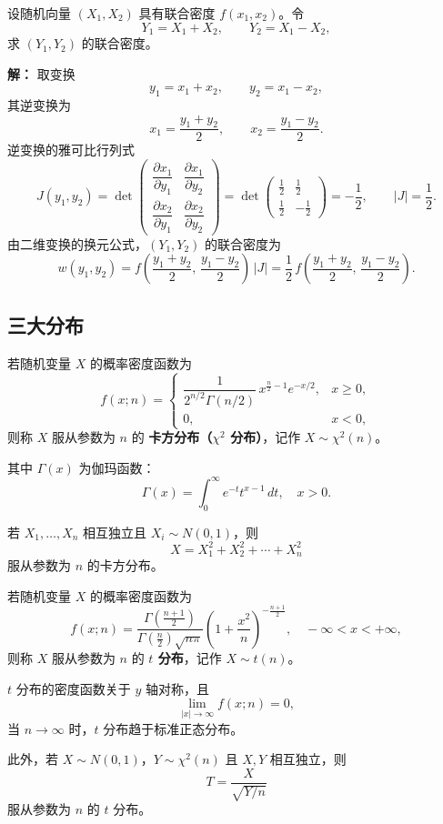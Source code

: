 \begin{example}
设随机向量 $(X_1,X_2)$ 具有联合密度 $f(x_1,x_2)$。令
\[
Y_1=X_1+X_2,\qquad Y_2=X_1-X_2,
\]
求 $(Y_1,Y_2)$ 的联合密度。

\textbf{解：} 取变换
\[
y_1=x_1+x_2,\qquad y_2=x_1-x_2,
\]
其逆变换为
\[
x_1=\frac{y_1+y_2}{2},\qquad x_2=\frac{y_1-y_2}{2}.
\]
逆变换的雅可比行列式
\[
J(y_1,y_2)=
\det\begin{pmatrix}
\dfrac{\partial x_1}{\partial y_1} & \dfrac{\partial x_1}{\partial y_2}\\[6pt]
\dfrac{\partial x_2}{\partial y_1} & \dfrac{\partial x_2}{\partial y_2}
\end{pmatrix}
=\det\begin{pmatrix}
\frac12 & \frac12\\[4pt]
\frac12 & -\frac12
\end{pmatrix}
=-\frac12,
\qquad |J|=\frac12.
\]
由二维变换的换元公式，$(Y_1,Y_2)$ 的联合密度为
\[
w(y_1,y_2)
= f\!\left(\frac{y_1+y_2}{2},\,\frac{y_1-y_2}{2}\right)\,|J|
= \frac12\,f\!\left(\frac{y_1+y_2}{2},\,\frac{y_1-y_2}{2}\right).
\]
\end{example}
\subsection{三大分布}
\begin{definition}[卡方分布]
若随机变量 $X$ 的概率密度函数为
\[
f(x;n)=
\begin{cases}
\dfrac{1}{2^{n/2}\Gamma(n/2)}\,x^{\frac{n}{2}-1}e^{-x/2}, & x\ge0,\\[6pt]
0, & x<0,
\end{cases}
\]
则称 $X$ 服从参数为 $n$ 的 \textbf{卡方分布（$\chi^2$ 分布）}，记作 $X\sim\chi^2(n)$。

其中 $\Gamma(x)$ 为伽玛函数：
\[
\Gamma(x)=\int_0^{\infty} e^{-t}t^{x-1}\,dt, \quad x>0.
\]

若 $X_1,\ldots,X_n$ 相互独立且 $X_i\sim N(0,1)$，则
\[
X=X_1^2+X_2^2+\cdots+X_n^2
\]
服从参数为 $n$ 的卡方分布。
\end{definition}
\begin{definition}[$t$ 分布]
若随机变量 $X$ 的概率密度函数为
\[
f(x;n)
= \frac{\Gamma\!\left(\frac{n+1}{2}\right)}
{\Gamma\!\left(\frac{n}{2}\right)\sqrt{n\pi}}
\left(1+\frac{x^2}{n}\right)^{-\frac{n+1}{2}},
\quad -\infty < x < +\infty,
\]
则称 $X$ 服从参数为 $n$ 的 \textbf{$t$ 分布}，记作 $X\sim t(n)$。

$t$ 分布的密度函数关于 $y$ 轴对称，且
\[
\lim_{|x|\to\infty} f(x;n)=0,
\]
当 $n\to\infty$ 时，$t$ 分布趋于标准正态分布。

此外，若 $X\sim N(0,1)$，$Y\sim\chi^2(n)$ 且 $X,Y$ 相互独立，则
\[
T=\frac{X}{\sqrt{Y/n}}
\]
服从参数为 $n$ 的 $t$ 分布。
\end{definition}

